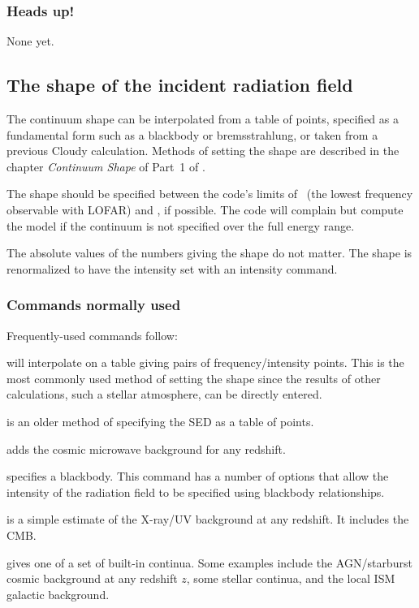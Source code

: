 \documentclass[12pt,twoside]{article}
\begin{document}
\subsubsection{Heads up!}

None yet.

\subsection{The shape of the incident radiation field}

The continuum shape can be interpolated from a table of points, specified
as a fundamental form such as a blackbody or bremsstrahlung, or taken from
a previous Cloudy calculation.  Methods of setting the shape are described
in the chapter \emph{Continuum Shape} of Part~1 of \Hazy.

The shape should be specified between the code's limits of \emmmhz\
(the lowest frequency observable with LOFAR)
and \egamrymev, if possible.  The code will complain but compute
the model if the continuum is not specified over the full energy range.

The absolute values of the numbers giving the shape do not matter.  The
shape is renormalized to have the intensity set with an intensity command.

\subsubsection{Commands normally used}

Frequently-used commands follow:

 will interpolate on a table giving
pairs of frequency/intensity points.  This is the most commonly used method
of setting the shape since the results of other calculations,
such a stellar atmosphere, can be directly entered.

 is an older method of specifying
the SED as a table of points.

 adds the cosmic microwave background for any redshift.

 specifies a blackbody.
This command has a number of options
that allow the intensity of the radiation field to be specified using
blackbody relationships.

 is a simple estimate
of the X-ray/UV background at any
redshift.  It includes the CMB.

 gives one of a set of built-in
continua.  Some examples include
the AGN\slash starburst cosmic background at any redshift $z$, some stellar
continua, and the local ISM galactic background.
\end{document}
